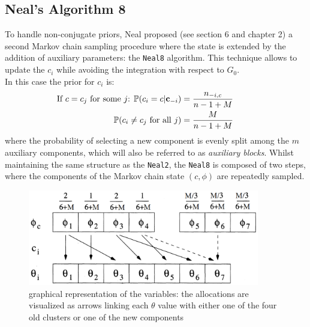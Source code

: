 \subsection{Neal's Algorithm 8} \label{neal8}
To handle non-conjugate priors, Neal proposed (see \cite{neal} section 6 and \cite{book} chapter 2) a second Markov chain sampling procedure where the state is extended by the addition of auxiliary parameters: the \verb|Neal8| algorithm.
This technique allows to update the $c_i$ while avoiding the integration with respect to $G_0$. \\
In this case the prior for $c_i$ is:
\begin{equation}
	\begin{aligned}
		\hspace{-25pt}
		\vspace{-12pt}
		\text{If $c=c_j$ for some $j$: } \PP(c_i=c | \mathbf c_{-i}) &= \frac{n_{-i,c}}{n-1+M}   \\
		\PP(c_{i}\neq c_{j} \text{ for all } j) &=\frac{M }{n-1+M}
	\end{aligned}	
\end{equation}
where the probability of selecting a new component is evenly split among the $m$ auxiliary components, which will also be referred to as \emph{auxiliary blocks}.
Whilst maintaining the same structure as the \verb|Neal2|, the \verb|Neal8| is composed of two steps, where the components of the Markov chain state $(c,\phi)$ are repeatedly sampled.

\begin{figure}[h]
    \centering
    \includegraphics[width=0.9\textwidth]{etc/neal8.png}
    \caption{graphical representation of the variables: the allocations are visualized as arrows linking each $\theta$ value with either one of the four old clusters or one of the new components}
    \label{fig:neal8}
\end{figure}

